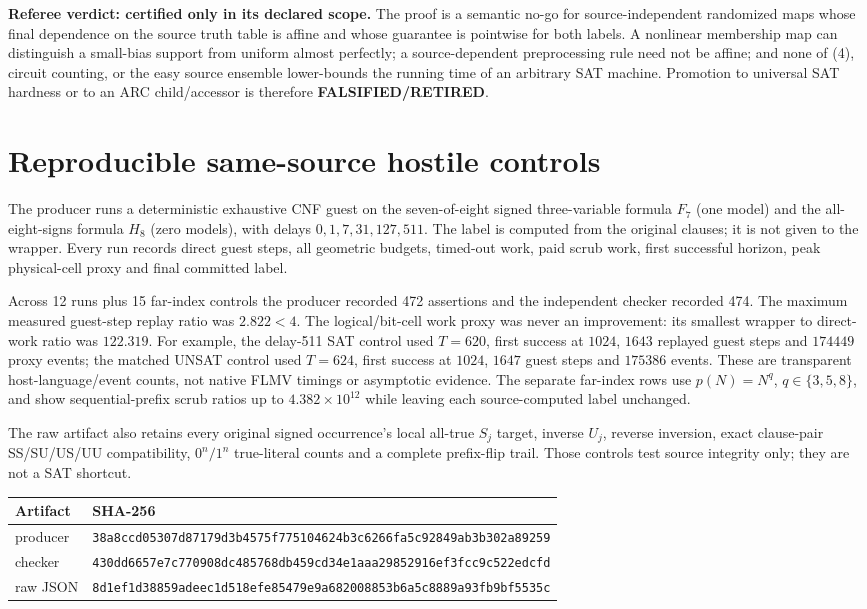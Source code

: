\documentclass[11pt]{article}
\begin{document}
\textbf{Referee verdict: certified only in its declared scope.}  The proof is a
semantic no-go for source-independent randomized maps whose final dependence on
the source truth table is affine and whose guarantee is pointwise for both
labels.  A nonlinear membership map can distinguish a small-bias support from
uniform almost perfectly; a source-dependent preprocessing rule need not be
affine; and none of (4), circuit counting, or the easy source ensemble lower-bounds
the running time of an arbitrary SAT machine.  Promotion to universal SAT
hardness or to an ARC child/accessor is therefore \textbf{FALSIFIED/RETIRED}.

\section{Reproducible same-source hostile controls}
The producer runs a deterministic exhaustive CNF guest on the seven-of-eight
signed three-variable formula $F_7$ (one model) and the all-eight-signs formula
$H_8$ (zero models), with delays $0,1,7,31,127,511$.  The label is computed from
the original clauses; it is not given to the wrapper.  Every run records direct
guest steps, all geometric budgets, timed-out work, paid scrub work, first
successful horizon, peak physical-cell proxy and final committed label.

Across 12 runs plus 15 far-index controls the producer recorded 472 assertions
and the independent checker recorded 474.  The maximum measured guest-step
replay ratio was $2.822<4$.
The logical/bit-cell work proxy was never an improvement: its smallest wrapper
to direct-work ratio was $122.319$.  For example, the delay-511 SAT control used
$T=620$, first success at $1024$, $1643$ replayed guest steps and $174449$ proxy
events; the matched UNSAT control used $T=624$, first success at $1024$, $1647$
guest steps and $175386$ events.  These are transparent host-language/event
counts, not native FLMV timings or asymptotic evidence.  The separate far-index
rows use $p(N)=N^q$, $q\in\{3,5,8\}$, and show sequential-prefix scrub ratios up
to $4.382\times10^{12}$ while leaving each source-computed label unchanged.

The raw artifact also retains every original signed occurrence's local all-true
$S_j$ target, inverse $U_j$, reverse inversion, exact clause-pair SS/SU/US/UU
compatibility, $0^n/1^n$ true-literal counts and a complete prefix-flip trail.
Those controls test source integrity only; they are not a SAT shortcut.

\begin{center}\small
\begin{tabular}{ll}
\toprule
Artifact & SHA-256\\\midrule
producer & \texttt{38a8ccd05307d87179d3b4575f775104624b3c6266fa5c92849ab3b302a89259}\\
checker & \texttt{430dd6657e7c770908dc485768db459cd34e1aaa29852916ef3fcc9c522edcfd}\\
raw JSON & \texttt{8d1ef1d38859adeec1d518efe85479e9a682008853b6a5c8889a93fb9bf5535c}\\
\bottomrule
\end{tabular}
\end{center}
\end{document}
